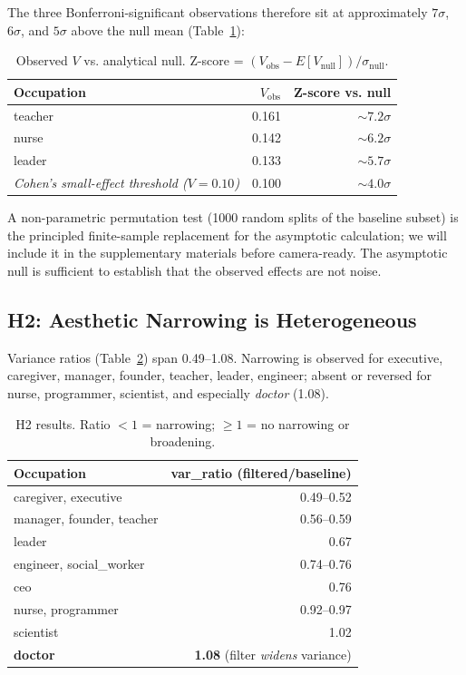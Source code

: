 \documentclass[manuscript, nonacm, screen, review]{acmart}
\begin{document}
The three Bonferroni-significant observations therefore sit at approximately $7\sigma$, $6\sigma$, and $5\sigma$ above the null mean (Table~\ref{tab:null}):

\begin{table}[h]
\centering\small
\caption{Observed $V$ vs. analytical null. Z-score = $(V_{\text{obs}}\!-\!E[V_{\text{null}}]) / \sigma_{\text{null}}$.}
\label{tab:null}
\begin{tabular}{lrr}
\toprule
\textbf{Occupation} & $V_{\text{obs}}$ & Z-score vs. null \\
\midrule
teacher & 0.161 & $\sim\!7.2\sigma$ \\
nurse   & 0.142 & $\sim\!6.2\sigma$ \\
leader  & 0.133 & $\sim\!5.7\sigma$ \\
\midrule
\textit{Cohen's small-effect threshold ($V\!=\!0.10$)} & 0.100 & $\sim\!4.0\sigma$ \\
\bottomrule
\end{tabular}
\end{table}

A non-parametric permutation test (1000 random splits of the baseline subset) is the principled finite-sample replacement for the asymptotic calculation; we will include it in the supplementary materials before camera-ready. The asymptotic null is sufficient to establish that the observed effects are not noise.

\subsection{H2: Aesthetic Narrowing is Heterogeneous}

Variance ratios (Table~\ref{tab:h2}) span 0.49--1.08. Narrowing is observed for executive, caregiver, manager, founder, teacher, leader, engineer; absent or reversed for nurse, programmer, scientist, and especially \emph{doctor} (1.08).

\begin{table}[h]
\centering\small
\caption{H2 results. Ratio $<1$ = narrowing; $\geq 1$ = no narrowing or broadening.}
\label{tab:h2}
\begin{tabular}{lr}
\toprule
\textbf{Occupation} & \textbf{var\_ratio} (filtered/baseline) \\
\midrule
caregiver, executive   & 0.49--0.52 \\
manager, founder, teacher  & 0.56--0.59 \\
leader  & 0.67 \\
engineer, social\_worker  & 0.74--0.76 \\
ceo  & 0.76 \\
nurse, programmer  & 0.92--0.97 \\
scientist  & 1.02 \\
\textbf{doctor}  & \textbf{1.08} (filter \emph{widens} variance) \\
\bottomrule
\end{tabular}
\end{table}
\end{document}
